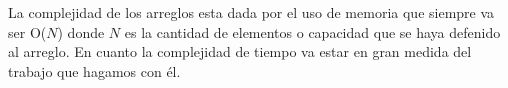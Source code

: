 La complejidad de los arreglos esta dada por el uso de memoria que siempre va ser O($N$) donde $N$ es la cantidad de elementos o capacidad que se haya defenido al arreglo. En cuanto la complejidad de tiempo va estar en gran medida del trabajo que hagamos con él.  